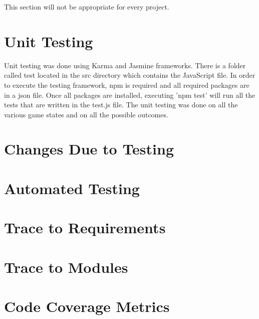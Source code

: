 \documentclass[12pt, titlepage]{article}
\begin{document}
This section will not be appropriate for every project.

\section{Unit Testing}
Unit testing was done using Karma and Jasmine frameworks. There is a folder called test
located in the src directory which contains the JavaScript file. In order to execute the testing framework, 
npm is required and all required packages are in a json file. Once all packages are installed, 
executing 'npm test' will run all the tests that are written in the test.js file. The unit testing was done on all the various game states and on all the possible outcomes.

\section{Changes Due to Testing}

\section{Automated Testing}
		
\section{Trace to Requirements}
		
\section{Trace to Modules}		

\section{Code Coverage Metrics}




\end{document}
